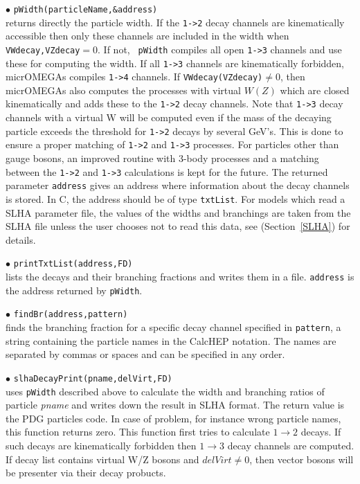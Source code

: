 \documentclass[12pt,a4paper]{article}
\begin{document}
\noindent
$\bullet$ \verb|pWidth(particleName,&address)|\\
returns directly the particle width. If the  \verb|1->2| 
decay channels are kinematically accessible then only these channels are
included in the width when \verb|VWdecay,VZdecay|$ = 0$.  If not, {\tt
pWidth} compiles all open \verb|1->3| channels and use these for  computing the width.
If all \verb|1->3| channels are kinematically forbidden, micrOMEGAs compiles \verb|1->4| channels.
If \verb|VWdecay(VZdecay)|$\ne 0$, then micrOMEGAs  also computes the processes with virtual $W(Z)$ which 
are closed kinematically and adds these to the \verb|1->2| decay channels.
 Note that \verb|1->3| decay channels with a virtual W  will be computed even
if the mass of the decaying particle exceeds the threshold for \verb|1->2| decays by several GeV's. This is done to ensure a 
proper matching of \verb|1->2| and \verb|1->3| processes.  For  particles other than gauge bosons,
an improved routine with 3-body processes and a matching  between
the \verb|1->2| and \verb|1->3| calculations is kept for the future. 
The returned  parameter \verb|address| 
gives  an address where information about the decay channels is stored.
In C, the address should be of type {\tt  txtList}.
For models which read a SLHA parameter file, the values of the widths and branchings are taken from the SLHA
file unless the user chooses not to read this data, see (Section~\ref{SLHA}) for details.
  

\noindent
$\bullet$ \verb|printTxtList(address,FD)|\\
lists the decays and their branching fractions and writes them in a file.
{\tt address} is the address returned by {\tt pWidth}.  

\noindent
$\bullet$ \verb|findBr(address,pattern)|\\ 
finds the branching fraction for a specific decay channel specified in
{\tt pattern},  a string containing the particle names 
in the CalcHEP notation. The names are separated by commas or spaces and can be specified in any
order. 

\noindent
$\bullet$ \verb|slhaDecayPrint(pname,delVirt,FD)|\\
uses \verb|pWidth| described above to calculate the width and branching ratios of particle {\it pname} and writes down the result
in SLHA format. The return value is the PDG particles code. In case of problem, for
instance wrong particle names, this function returns zero. This function
first tries to calculate $1\to2$  decays. If such decays are kinematically
forbidden then $1\to3$ decay channels are computed. If decay list contains
virtual W/Z bosons and $delVirt \ne 0$, then  vector bosons will be presenter
via their  decay probucts.
\end{document}

